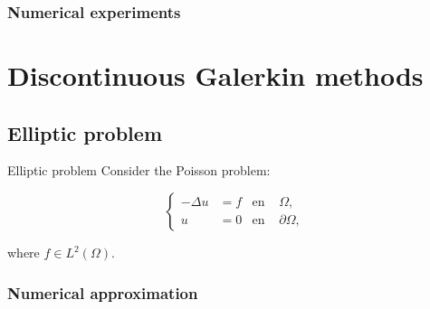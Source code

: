 \subsubsection{Numerical experiments}

\section{Discontinuous Galerkin methods}

	\subsection{Elliptic problem}

	\begin{frame}{Elliptic problem}
		Consider the Poisson problem:
		\begin{block}{}
		\begin{equation*}
		\left\{
		\begin{aligned}
		-\Delta u&=f & \text{en } &\Omega, \\
		u&=0 & \text{en } &\partial\Omega,
		\end{aligned}
		\right.
		\end{equation*}
		\end{block}
		where $f\in L^2\left(\Omega\right)$.
	\end{frame}

	\subsubsection{Numerical approximation}

